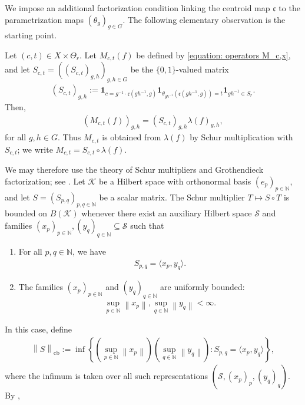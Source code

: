 \documentclass[12pt,reqno]{amsart}
\newcommand{\N}{\mathbb{N}}
\newcommand{\norm}[1]{\left\|#1\right\|}
\numberwithin{equation}{section}
\begin{document}
We impose an additional factorization condition linking the centroid map $\mathfrak{c}$ to the parametrization maps $(\theta_g)_{g\in G}$. The following elementary observation is the starting point. 
\begin{lemma}\label{lemma: Schur decomposition}
    Let $(c,t)\in X\times \Theta_r$.
    Let $M_{c,t}(f)$ be defined by \eqref{equation: operators M_c,x}, and let $S_{c,t}=((S_{c,t})_{g,h})_{g,h\in G}$ be the $\{0,1\}$-valued matrix
    \begin{align*}
        (S_{c,t})_{g,h}:=\mathbf{1}_{c=g^{-1}\cdot\mathfrak{c}(gh^{-1},g)}\mathbf{1}_{\theta_{gh^{-1}}(\mathfrak{c}(gh^{-1},g))=t}\mathbf{1}_{gh^{-1}\in S_r}.
    \end{align*}
    Then,
    \begin{align*}
        (M_{c,t}(f))_{g,h}=(S_{c,t})_{g,h} \lambda(f)_{g,h},
    \end{align*}
    for all $g,h\in G$. Thus $M_{c,t}$ is obtained from $\lambda(f)$ by Schur multiplication with $S_{c,t}$; we write $M_{c,t}=S_{c,t}\circ\lambda(f)$.
\end{lemma}
We may therefore use the theory of Schur multipliers and Grothendieck factorization; see \cite[Chapter 5]{Pisier2001}. Let $\mathcal{K}$ be a Hilbert space with orthonormal basis $(e_p)_{p\in\N}$, and let $S=(S_{p,q})_{p,q\in\N}$ be a scalar matrix. The Schur multiplier $T\mapsto S\circ T$ is bounded on $B(\mathcal{K})$ whenever there exist an auxiliary Hilbert space $\mathcal{S}$ and families $(x_p)_{p\in\N},(y_q)_{q\in\N}\subseteq\mathcal{S}$ such that
\begin{enumerate}
    \item For all $p,q\in \N$, we have
    \begin{align*}
        S_{p,q}=\langle x_p,y_q\rangle.
    \end{align*}
    \item The families $(x_p)_{p\in\N}$ and $(y_q)_{q\in\N}$ are uniformly bounded:
    \begin{align*}
        \sup_{p\in \N}\norm{x_p},\sup_{q\in \N}\norm{y_q}<\infty.
    \end{align*}
\end{enumerate}
In this case, define
    \begin{align*}
        \norm{S}_{\operatorname{cb}}:=\inf\left\{\left(\sup_{p\in \N}\norm{x_p}\right)\left(\sup_{q\in \N}\norm{y_q}\right): S_{p,q}=\langle x_p,y_q\rangle\right\},
    \end{align*}
where the infimum is taken over all such representations $(\mathcal{S},(x_p)_p,(y_q)_q)$. By \cite[Theorem 5.1]{Pisier2001},
\end{document}
